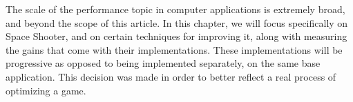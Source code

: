 The scale of the performance topic in computer applications is extremely broad, and beyond the scope of this article. In this chapter, we will focus specifically on Space Shooter, and on certain techniques for improving it, along with measuring the gains that come with their implementations. These implementations will be progressive as opposed to being implemented separately, on the same base application. This decision was made in order to better reflect a real process of optimizing a game.